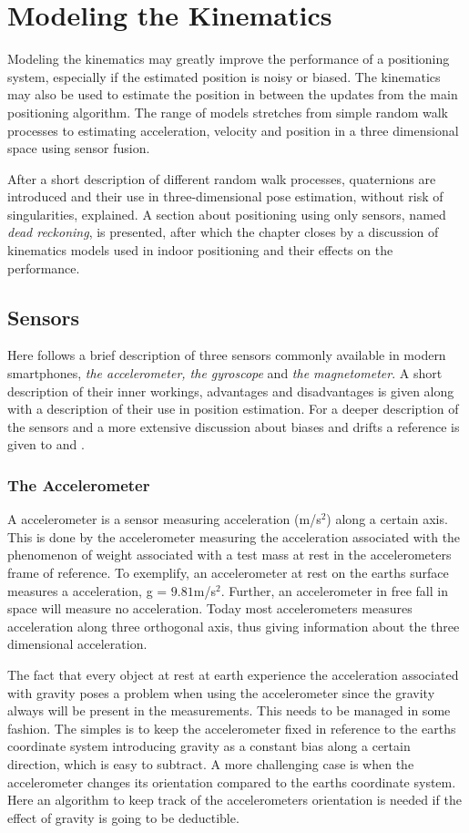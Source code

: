 \documentclass{LTHthesis}
\begin{document}
\chapter{Modeling the Kinematics} %
%
Modeling the kinematics may greatly improve the performance of a positioning system, especially if the estimated position is noisy or biased. The kinematics may also be used to estimate the position in between the updates from the main positioning algorithm. The range of models stretches from simple random walk processes to estimating acceleration, velocity and position in a three dimensional space using sensor fusion.

After a short description of different random walk processes, quaternions are introduced and their use in three-dimensional pose  estimation, without risk of singularities, explained. A section about positioning using only sensors, named \emph{dead reckoning}, is presented, after which the chapter closes by a discussion of kinematics models used in indoor positioning and their effects on the performance.   
%
\section{Sensors}
Here follows a brief description of three sensors commonly available in modern smartphones, \emph{the accelerometer, the gyroscope} and \emph{the magnetometer}. A short description of their inner workings, advantages and disadvantages is given along with a description of their use in position estimation. For a deeper description of the sensors and a more extensive discussion about biases and drifts a reference is given to \cite{bently88} and \cite{morris96}. 
%
\subsection{The Accelerometer}
%
A accelerometer is a sensor measuring acceleration (m/s$^2$) along a certain axis. This is done by the accelerometer measuring the acceleration associated with the phenomenon of weight associated with a test mass at rest in the accelerometers frame of reference. To exemplify, an accelerometer at rest on the earths surface measures a acceleration, g = $9.81$m/s$^2$. Further, an accelerometer in free fall in space will measure no acceleration. Today most accelerometers measures acceleration along three orthogonal axis, thus giving information about the three dimensional acceleration. 

The fact that every object at rest at earth experience the acceleration associated with gravity poses a problem when using the accelerometer since the gravity always will be present in the measurements. This needs to be managed in some fashion. The simples is to keep the accelerometer fixed in reference to the earths coordinate system introducing gravity as a constant bias along a certain direction, which is easy to subtract. A more challenging case is when the accelerometer changes its orientation compared to the earths coordinate system. Here an algorithm to keep track of the accelerometers orientation is needed if the effect of gravity is going to be deductible. 
\end{document}
